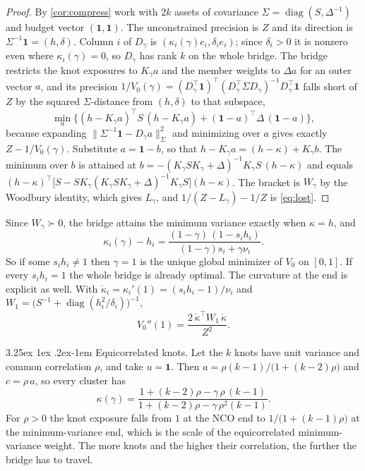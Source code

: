 \documentclass[11pt]{article}
\makeatletter
\renewcommand\paragraph{\@startsection{paragraph}{4}{\z@}%
  {3.25ex \@plus1ex \@minus.2ex}{-1em}%
  {\normalfont\normalsize\itshape}}
\newcommand{\ones}{\mathbf{1}}
\makeatother
\begin{document}
\begin{proof}
By \cref{cor:compress} work with $2k$ assets of covariance
$\Sigma=\operatorname{diag}(S,\Delta^{-1})$ and budget vector
$(\ones,\ones)$. The unconstrained precision is $Z$ and its direction is
$\Sigma^{-1}\ones=(h,\delta)$. Column $i$ of $D_\gamma$ is
$(\kappa_i(\gamma)e_i,\delta_ie_i)$; since $\delta_i>0$ it is nonzero even
where $\kappa_i(\gamma)=0$, so $D_\gamma$ has rank $k$ on the whole bridge.
The bridge restricts the knot exposures to $K_\gamma a$ and the member
weights to $\Delta a$ for an outer vector $a$, and its precision
$1/V_0(\gamma)=(D_\gamma^\top\ones)^\top(D_\gamma^\top\Sigma D_\gamma)^{-1}
D_\gamma^\top\ones$ falls short of $Z$ by the squared $\Sigma$-distance
from $(h,\delta)$ to that subspace,
\begin{equation*}
  \min_a\big\{(h-K_\gamma a)^\top S\,(h-K_\gamma a)
  +(\ones-a)^\top\Delta\,(\ones-a)\big\},
\end{equation*}
because expanding $\|\Sigma^{-1}\ones-D_\gamma a\|_\Sigma^2$ and minimizing
over $a$ gives exactly $Z-1/V_0(\gamma)$. Substitute $a=\ones-b$, so that
$h-K_\gamma a=(h-\kappa)+K_\gamma b$. The minimum over $b$ is attained at
$b=-(K_\gamma SK_\gamma+\Delta)^{-1}K_\gamma S\,(h-\kappa)$ and equals
$(h-\kappa)^\top\big[S-SK_\gamma(K_\gamma SK_\gamma+\Delta)^{-1}K_\gamma S\big]
(h-\kappa)$. The bracket is $W_\gamma$ by the Woodbury identity, which gives
$L_\gamma$, and $1/(Z-L_\gamma)-1/Z$ is \eqref{eq:lost}.
\end{proof}

Since $W_\gamma\succ0$, the bridge attains the minimum variance exactly when
$\kappa=h$, and
\begin{equation}
  \kappa_i(\gamma)-h_i=\frac{(1-\gamma)\,(1-s_ih_i)}{(1-\gamma)s_i+\gamma\nu_i}.
  \label{eq:kminush}
\end{equation}
So if some $s_ih_i\neq1$ then $\gamma=1$ is the unique global minimizer of
$V_0$ on $[0,1]$. If every $s_ih_i=1$ the whole bridge is already optimal.
The curvature at the end is explicit as well. With
$\dot\kappa_i=\kappa_i'(1)=(s_ih_i-1)/\nu_i$ and
$W_1=\big(S^{-1}+\operatorname{diag}(h_i^2/\delta_i)\big)^{-1}$,
\begin{equation}
  V_0''(1)=\frac{2\,\dot\kappa^\top W_1\,\dot\kappa}{Z^2}.
  \label{eq:curvature}
\end{equation}

\paragraph{Equicorrelated knots.} Let the $k$ knots have unit variance and
common correlation $\rho$, and take $u=\ones$. Then
$a=\rho(k-1)/\big(1+(k-2)\rho\big)$ and $c=\rho\,a$, so every cluster has
\begin{equation*}
  \kappa(\gamma)=\frac{1+(k-2)\rho-\gamma\,\rho\,(k-1)}{1+(k-2)\rho-\gamma\,\rho^2(k-1)} .
\end{equation*}
For $\rho>0$ the knot exposure falls from $1$ at the NCO end to
$1/\big(1+(k-1)\rho\big)$ at the minimum-variance end, which is the scale of
the equicorrelated minimum-variance weight. The more knots and the higher
their correlation, the further the bridge has to travel.
\end{document}

